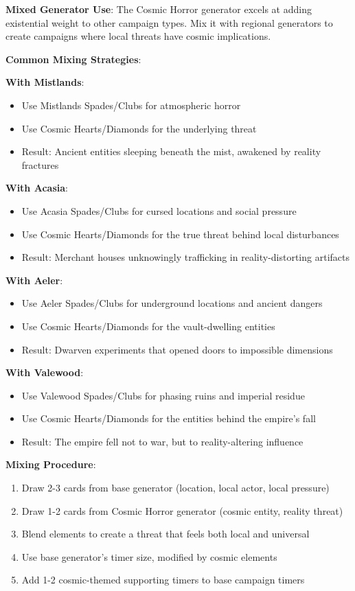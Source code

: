 \documentclass[11pt]{article}
\begin{document}
\begin{mdframed}[backgroundcolor=tableheader]
\textbf{Mixed Generator Use}:
The Cosmic Horror generator excels at adding existential weight to other campaign types. Mix it with regional generators to create campaigns where local threats have cosmic implications.

\textbf{Common Mixing Strategies}:

\textbf{With Mistlands}:
\begin{itemize}[leftmargin=*]
\item Use Mistlands Spades/Clubs for atmospheric horror
\item Use Cosmic Hearts/Diamonds for the underlying threat
\item Result: Ancient entities sleeping beneath the mist, awakened by reality fractures
\end{itemize}

\textbf{With Acasia}:
\begin{itemize}[leftmargin=*]
\item Use Acasia Spades/Clubs for cursed locations and social pressure
\item Use Cosmic Hearts/Diamonds for the true threat behind local disturbances
\item Result: Merchant houses unknowingly trafficking in reality-distorting artifacts
\end{itemize}

\textbf{With Aeler}:
\begin{itemize}[leftmargin=*]
\item Use Aeler Spades/Clubs for underground locations and ancient dangers
\item Use Cosmic Hearts/Diamonds for the vault-dwelling entities
\item Result: Dwarven experiments that opened doors to impossible dimensions
\end{itemize}

\textbf{With Valewood}:
\begin{itemize}[leftmargin=*]
\item Use Valewood Spades/Clubs for phasing ruins and imperial residue
\item Use Cosmic Hearts/Diamonds for the entities behind the empire's fall
\item Result: The empire fell not to war, but to reality-altering influence
\end{itemize}

\textbf{Mixing Procedure}:
\begin{enumerate}[leftmargin=*]
\item Draw 2-3 cards from base generator (location, local actor, local pressure)
\item Draw 1-2 cards from Cosmic Horror generator (cosmic entity, reality threat)
\item Blend elements to create a threat that feels both local and universal
\item Use base generator's timer size, modified by cosmic elements
\item Add 1-2 cosmic-themed supporting timers to base campaign timers
\end{enumerate}
\end{mdframed}
\end{document}
